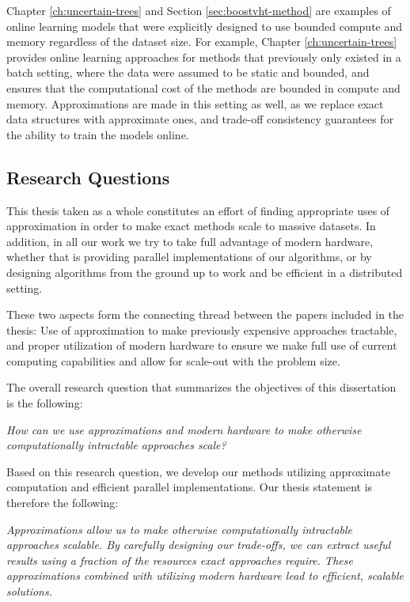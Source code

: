 Chapter \ref{ch:uncertain-trees} and Section \ref{sec:boostvht-method}
are examples of online learning models
that were explicitly designed to use bounded compute and memory regardless of the
dataset size. For example, Chapter \ref{ch:uncertain-trees} provides online learning approaches
for methods that previously only existed in a batch setting, where the data were assumed to be
static and bounded, and ensures that the computational cost of the methods are
bounded in compute and memory. Approximations are made in this setting as well,
as we replace exact data structures with approximate ones, and trade-off consistency
guarantees for the ability to train the models online.


\subsection{Research Questions}

This thesis taken as a whole constitutes an effort of finding appropriate
uses of approximation in order to make exact methods scale to massive datasets.
In addition, in all our work we try to take full advantage of modern hardware,
whether that is providing parallel implementations of our algorithms,
or by designing algorithms from the
ground up to work and be efficient in a distributed setting.

These two aspects form the connecting thread between the papers
included in the thesis: Use of approximation to make previously expensive approaches tractable, and
proper utilization of modern hardware to ensure we make full use of current
computing capabilities and allow for scale-out with the problem size.

The overall research question that summarizes the objectives of this dissertation is the following:

\begin{displayquote}
	\emph{How can we use approximations and modern hardware to make otherwise computationally intractable
	approaches scale?}
\end{displayquote}

\noindent
Based on this research question, we develop our methods utilizing approximate computation and efficient parallel implementations. Our thesis statement is therefore the following:

\begin{displayquote}
	\emph{Approximations allow us to make otherwise computationally intractable approaches scalable.
	By carefully designing our trade-offs, we can extract useful results using a fraction
	of the resources exact approaches require. These approximations combined with utilizing modern hardware lead to efficient, scalable solutions.}
\end{displayquote}



